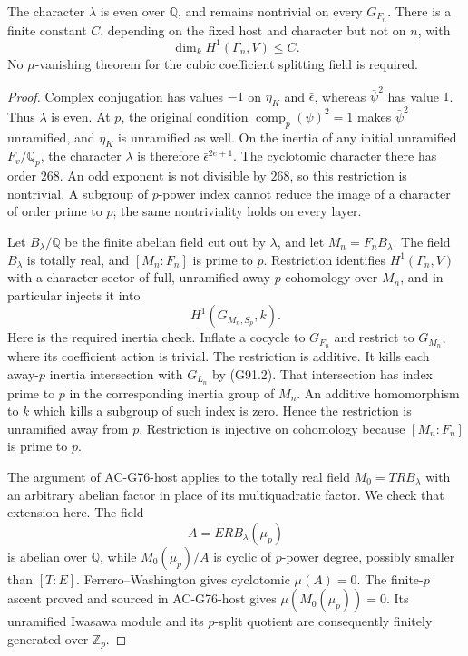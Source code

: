 \begin{lemma}
\label{lem:G91-bound}
The character $\lambda$ is even over $\mathbb Q$, and remains
nontrivial on every $G_{F_n}$.  There is a finite constant $C$,
depending on the fixed host and character but not on $n$, with
\[
 \dim_k H^1(\Gamma_n,V)\leq C.
 \tag{G91.4}
\]
No $\mu$-vanishing theorem for the cubic coefficient splitting
field is required.
\end{lemma}

\begin{proof}
Complex conjugation has values $-1$ on $\eta_K$ and
$\bar\epsilon$, whereas $\bar\psi^2$ has value $1$.
Thus $\lambda$ is even.  At $p$, the original condition
$\operatorname{comp}_p(\psi)^2=1$ makes $\bar\psi^2$
unramified, and $\eta_K$ is unramified as well.
On the inertia of any initial unramified $F_v/\mathbb Q_p$,
the character $\lambda$ is therefore
$\bar\epsilon^{2e+1}$.
The cyclotomic character there has order $268$.
An odd exponent is not divisible by $268$, so this restriction
is nontrivial.  A subgroup of $p$-power index cannot reduce
the image of a character of order prime to $p$; the same
nontriviality holds on every layer.

Let $B_\lambda/\mathbb Q$ be the finite abelian field cut out
by $\lambda$, and let $M_n=F_nB_\lambda$.
The field $B_\lambda$ is totally real, and $[M_n:F_n]$ is
prime to $p$.  Restriction identifies $H^1(\Gamma_n,V)$
with a character sector of full, unramified-away-$p$
cohomology over $M_n$, and in particular injects it into
\[
                    H^1(G_{M_n,S_p},k).
 \tag{G91.5}
\]
Here is the required inertia check.  Inflate a cocycle to
$G_{F_n}$ and restrict to $G_{M_n}$, where its coefficient
action is trivial.  The restriction is additive.  It kills
each away-$p$ inertia intersection with $G_{L_n}$ by (G91.2).
That intersection has index prime to $p$ in the corresponding
inertia group of $M_n$.  An additive homomorphism to $k$ which
kills a subgroup of such index is zero.  Hence the restriction
is unramified away from $p$.  Restriction is injective on
cohomology because $[M_n:F_n]$ is prime to $p$.

The argument of AC-G76-host applies to the totally real field
$M_0=TRB_\lambda$ with an arbitrary abelian factor in place
of its multiquadratic factor.  We check that extension here.
The field
\[
 A=ERB_\lambda(\mu_p)
\]
is abelian over $\mathbb Q$, while
$M_0(\mu_p)/A$ is cyclic of $p$-power degree, possibly smaller
than $[T:E]$.  Ferrero--Washington gives cyclotomic
$\mu(A)=0$.  The finite-$p$ ascent proved and sourced in
AC-G76-host gives $\mu(M_0(\mu_p))=0$.
Its unramified Iwasawa module and its $p$-split quotient
are consequently finitely generated over $\mathbb Z_p$.


\end{proof}
